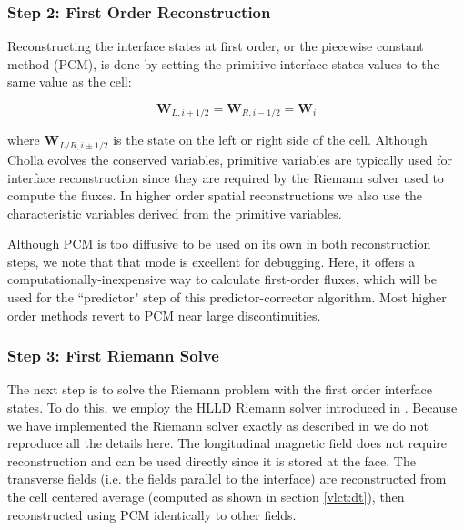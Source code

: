 \documentclass[modern, linenumbers]{aastex631}
\begin{document}
\subsubsection{Step 2: First Order Reconstruction}
\label{vlct:first-order-reconstruction}

Reconstructing the interface states at first order, or the piecewise constant method (PCM), is done by setting the primitive interface states values to the same value as the cell:

\begin{equation}
    \boldsymbol{W}_{L, i+1/2} = \boldsymbol{W}_{R, i-1/2} = \boldsymbol{W}_{i}
\end{equation}

\noindent where $ \boldsymbol{W}_{L/R, i\pm1/2} $ is the state on the left or right side of the cell. Although Cholla evolves the conserved variables, primitive variables are typically used for interface reconstruction since they are required by the Riemann solver used to compute the fluxes. In higher order spatial reconstructions we also use the characteristic variables derived from the primitive variables.

Although PCM is too diffusive to be used on its own in both reconstruction steps, we note that that mode is excellent for debugging. Here, it offers a computationally-inexpensive way to calculate first-order fluxes, which will be used for the ``predictor" step of this predictor-corrector algorithm\textbf{\citep{van_leer_2006, stone_2009}}. Most higher order methods revert to PCM near large discontinuities\textbf{\citep{leveque2002finite}}.

\subsubsection{Step 3: First Riemann Solve}
\label{vlct:first-riemann-solve}

The next step is to solve the Riemann problem with the first order interface states. To do this, we employ the HLLD Riemann solver introduced in \cite{hlld_2005}. Because we have implemented the Riemann solver exactly as described in \cite{hlld_2005} we do not reproduce all the details here. The longitudinal magnetic field does not require reconstruction and can be used directly since it is stored at the face. The transverse fields (i.e. the fields parallel to the interface) are reconstructed from the cell centered average (computed as shown in section \ref{vlct:dt}), then reconstructed using PCM identically to other fields.
\end{document}

